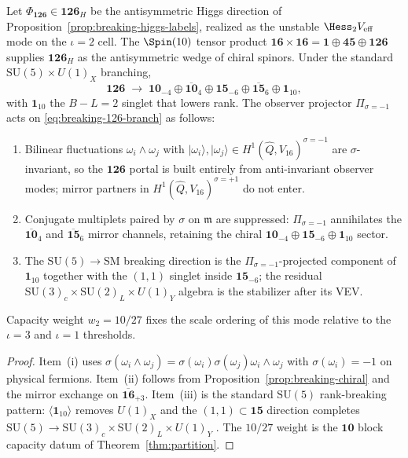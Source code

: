 \begin{lemma}[$\mathbf{126}_H$ decomposition under $\Pi_{\sigma=-1}$]
\label{lem:breaking-126-sigma}
Let $\Phi_{\mathbf{126}}\in\mathbf{126}_H$ be the antisymmetric Higgs direction
of Proposition~\ref{prop:breaking-higgs-labels}, realized as the unstable
$\Hess_2 V_{\mathrm{eff}}$ mode on the $\iota=2$ cell. The $\Spin(10)$ tensor
product $\mathbf{16}\times\mathbf{16}=\mathbf{1}\oplus\mathbf{45}\oplus
\mathbf{126}$ supplies $\mathbf{126}_H$ as the antisymmetric wedge of chiral
spinors. Under the standard $\mathrm{SU}(5)\times U(1)_X$ branching,
\begin{equation}\label{eq:breaking-126-branch}
  \mathbf{126}
  \;\longrightarrow\;
  \mathbf{10}_{-4}\oplus\overline{\mathbf{10}}_{4}
  \oplus\mathbf{15}_{-6}\oplus\overline{\mathbf{15}}_{6}
  \oplus\mathbf{1}_{10},
\end{equation}
with $\mathbf{1}_{10}$ the $B\!-\!L=2$ singlet that lowers rank. The observer
projector $\Pi_{\sigma=-1}$ acts on \eqref{eq:breaking-126-branch} as follows:
\begin{enumerate}[label=(\roman*),leftmargin=*]
  \item Bilinear fluctuations $\omega_i\wedge\omega_j$ with
    $|\omega_i\rangle,|\omega_j\rangle\in H^1(\hat Q,V_{16})^{\sigma=-1}$
    are $\sigma$-invariant, so the $\mathbf{126}$ portal is built entirely from
    anti-invariant observer modes; mirror partners in
    $H^1(\hat Q,V_{16})^{\sigma=+1}$ do not enter.
  \item Conjugate multiplets paired by $\sigma$ on $\mathfrak{m}$ are suppressed:
    $\Pi_{\sigma=-1}$ annihilates the $\overline{\mathbf{10}}_{4}$ and
    $\overline{\mathbf{15}}_{6}$ mirror channels, retaining the chiral
    $\mathbf{10}_{-4}\oplus\mathbf{15}_{-6}\oplus\mathbf{1}_{10}$ sector.
  \item The $\mathrm{SU}(5)\to$SM breaking direction is the
    $\Pi_{\sigma=-1}$-projected component of $\mathbf{1}_{10}$ together with
    the $(1,1)$ singlet inside $\mathbf{15}_{-6}$; the residual
    $\mathrm{SU}(3)_c\times\mathrm{SU}(2)_L\times U(1)_Y$ algebra is the
    stabilizer after its VEV.
\end{enumerate}
Capacity weight $w_2=10/27$ fixes the scale ordering of this mode relative to
the $\iota=3$ and $\iota=1$ thresholds.
\end{lemma}

\begin{proof}
Item~(i) uses $\sigma(\omega_i\wedge\omega_j)=\sigma(\omega_i)\sigma(\omega_j)
\omega_i\wedge\omega_j$ with $\sigma(\omega_i)=-1$ on physical fermions.
Item~(ii) follows from Proposition~\ref{prop:breaking-chiral} and the mirror
exchange on $\overline{\mathbf{16}}_{+3}$. Item~(iii) is the standard
$\mathrm{SU}(5)$ rank-breaking pattern: $\langle\mathbf{1}_{10}\rangle$ removes
$U(1)_X$ and the $(1,1)\subset\mathbf{15}$ direction completes
$\mathrm{SU}(5)\to\mathrm{SU}(3)_c\times\mathrm{SU}(2)_L\times U(1)_Y$
\cite{GeorgiGlashow1974,Witten1985}. The $10/27$ weight is the $\mathbf{10}$
block capacity datum of Theorem~\ref{thm:partition}.
\end{proof}

